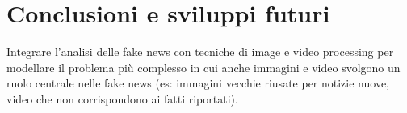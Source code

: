 \documentclass[12pt]{report}
\theoremstyle{definition}
\begin{document}
\chapter*{Conclusioni e sviluppi futuri}
\onehalfspacing

Integrare l'analisi delle fake news con tecniche di image e video processing per modellare il problema più complesso in cui anche immagini e video svolgono un ruolo centrale nelle fake news (es: immagini vecchie riusate per notizie nuove, video che non corrispondono ai fatti riportati).

\printbibliography

%
\end{document}
